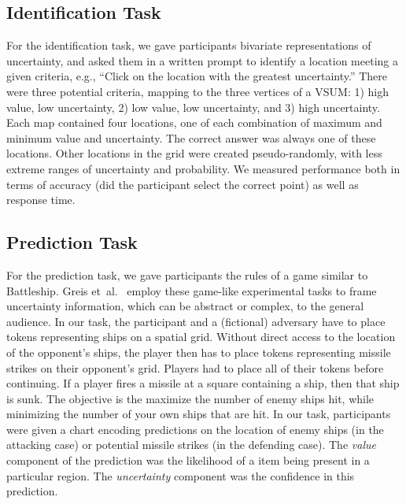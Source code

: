 \documentclass{vgtc}                          %
\newcommand{\ea}{{et~al.}\xspace}
\begin{document}
\subsection{Identification Task}

For the identification task, we gave participants bivariate representations of uncertainty, and asked them in a written prompt to identify a location meeting a given criteria, e.g., ``Click on the location with the greatest uncertainty.'' There were three potential criteria, mapping to the three vertices of a VSUM: 1) high value, low uncertainty, 2) low value, low uncertainty, and 3) high uncertainty. Each map contained four locations, one of each combination of maximum and minimum value and uncertainty. The correct answer was always one of these locations. Other locations in the grid were created pseudo-randomly, with less extreme ranges of uncertainty and probability. We measured performance both in terms of accuracy (did the participant select the correct point) as well as response time.

\subsection{Prediction Task}

\taskTwoFig

For the prediction task, we gave participants the rules of a game similar to Battleship. Greis \ea~\cite{greis2016decision} employ these game-like experimental tasks to frame uncertainty information, which can be abstract or complex, to the general audience. In our task, the participant and a (fictional) adversary have to place tokens representing ships on a spatial grid. Without direct access to the location of the opponent's ships, the player then has to place tokens representing missile strikes on their opponent's grid. Players had to place all of their tokens before continuing. If a player fires a missile at a square containing a ship, then that ship is sunk. The objective is the maximize the number of enemy ships hit, while minimizing the number of your own ships that are hit. In our task, participants were given a chart encoding predictions on the location of enemy ships (in the attacking case) or potential missile strikes (in the defending case). The \emph{value} component of the prediction was the likelihood of a item being present in a particular region. The \emph{uncertainty} component was the confidence in this prediction.
\end{document}

